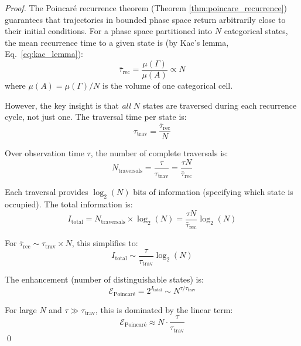 \documentclass[twocolumn,10pt]{article}
\theoremstyle{remark}
\begin{document}
\begin{proof}
The Poincaré recurrence theorem (Theorem \ref{thm:poincare_recurrence}) guarantees that trajectories in bounded phase space return arbitrarily close to their initial conditions. For a phase space partitioned into $N$ categorical states, the mean recurrence time to a given state is (by Kac's lemma, Eq.~\ref{eq:kac_lemma}):
\begin{equation}
    \bar{\tau}_{\text{rec}} = \frac{\mu(\Gamma)}{\mu(A)} \propto N
    \label{eq:recurrence_time_scaling}
\end{equation}
where $\mu(A) = \mu(\Gamma)/N$ is the volume of one categorical cell.

However, the key insight is that \textit{all} $N$ states are traversed during each recurrence cycle, not just one. The traversal time per state is:
\begin{equation}
    \tau_{\text{trav}} = \frac{\bar{\tau}_{\text{rec}}}{N}
    \label{eq:traversal_time}
\end{equation}

Over observation time $\tau$, the number of complete traversals is:
\begin{equation}
    N_{\text{traversals}} = \frac{\tau}{\tau_{\text{trav}}} = \frac{\tau N}{\bar{\tau}_{\text{rec}}}
    \label{eq:num_traversals}
\end{equation}

Each traversal provides $\log_2(N)$ bits of information (specifying which state is occupied). The total information is:
\begin{equation}
    I_{\text{total}} = N_{\text{traversals}} \times \log_2(N) = \frac{\tau N}{\bar{\tau}_{\text{rec}}} \log_2(N)
    \label{eq:total_information}
\end{equation}

For $\bar{\tau}_{\text{rec}} \sim \tau_{\text{trav}} \times N$, this simplifies to:
\begin{equation}
    I_{\text{total}} \sim \frac{\tau}{\tau_{\text{trav}}} \log_2(N)
    \label{eq:information_simplified}
\end{equation}

The enhancement (number of distinguishable states) is:
\begin{equation}
    \mathcal{E}_{\text{Poincaré}} = 2^{I_{\text{total}}} \sim N^{\tau/\tau_{\text{trav}}}
    \label{eq:poincare_enhancement_exponential}
\end{equation}

For large $N$ and $\tau \gg \tau_{\text{trav}}$, this is dominated by the linear term:
\begin{equation}
    \mathcal{E}_{\text{Poincaré}} \approx N \cdot \frac{\tau}{\tau_{\text{trav}}}
\end{equation}
\qed
\end{proof}
\end{document}
